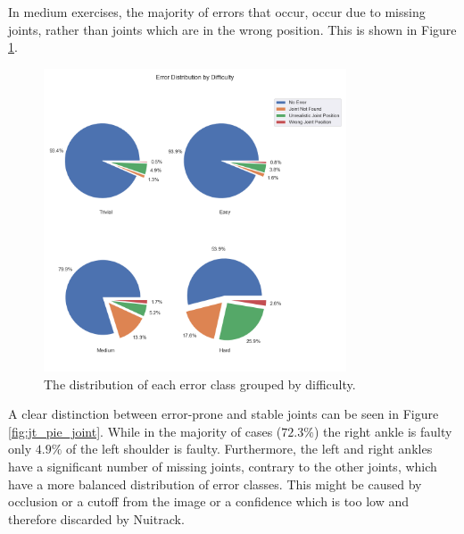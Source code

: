 In medium exercises, the majority of errors that occur, occur due to missing joints, rather than joints which are in the wrong position. This is shown in Figure \ref{fig:jt_pie_diff}.

\begin{figure}
  \centering
  \includegraphics[width=0.8\textwidth]{figures/Data/dist_joints/Error_Distribution_by_Difficulty.png}
  \caption[Error Distribution for each error class by difficulty]{The distribution of each error class grouped by difficulty.}
  \label{fig:jt_pie_diff}
\end{figure}

A clear distinction between error-prone and stable joints can be seen in Figure \ref{fig:jt_pie_joint}. While in the majority of cases ($72.3\%$) the right ankle is faulty only $4.9\%$ of the left shoulder is faulty. Furthermore, the left and right ankles have a significant number of missing joints, contrary to the other joints, which have a more balanced distribution of error classes. This might be caused by occlusion or a cutoff from the image or a confidence which is too low and therefore discarded by Nuitrack.

